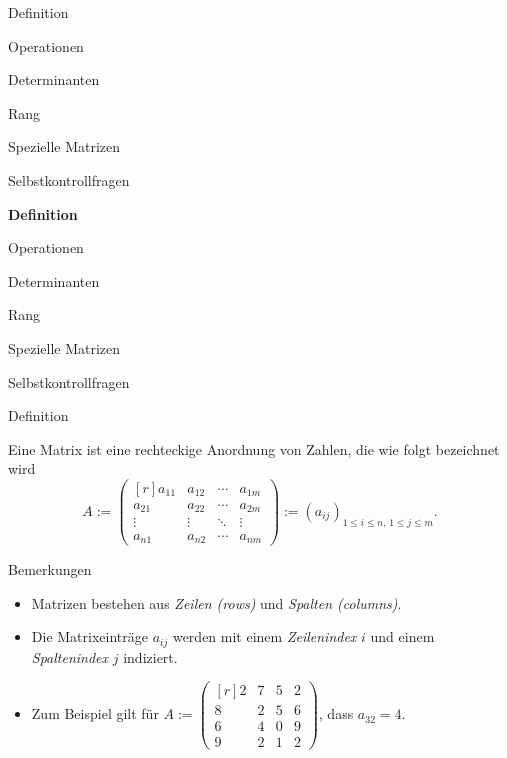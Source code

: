 \documentclass[
  8pt,
  ignorenonframetext,
]{beamer}
\begin{document}
\begin{frame}{}
\protect\hypertarget{section-2}{}
\large
{}
\vfill

Definition

Operationen

Determinanten

Rang

Spezielle Matrizen

Selbstkontrollfragen \vfill
\end{frame}

\begin{frame}{}
\protect\hypertarget{section-3}{}
\large
{}
\vfill

\textbf{Definition}

Operationen

Determinanten

Rang

Spezielle Matrizen

Selbstkontrollfragen \vfill
\end{frame}

\begin{frame}{Definition}
\protect\hypertarget{definition-1}{}
\small
\begin{definition}[Matrix]
Eine Matrix ist eine rechteckige Anordnung von Zahlen, die wie folgt bezeichnet
wird
\begin{equation}
A := \begin{pmatrix*}[r]
a_{11} & a_{12} & \cdots & a_{1m} \\
a_{21} & a_{22} & \cdots & a_{2m} \\
\vdots & \vdots & \ddots & \vdots \\
a_{n1} & a_{n2} & \cdots & a_{nm}
\end{pmatrix*}
:= {(a_{ij})}_{1\le i\le n,\, 1\le j\le m}.
\end{equation}
\end{definition}

\footnotesize

Bemerkungen

\begin{itemize}
\item
  Matrizen bestehen aus \emph{Zeilen (rows)} und \emph{Spalten
  (columns)}.
\item
  Die Matrixeinträge \(a_{ij}\) werden mit einem \emph{Zeilenindex}
  \(i\) und einem \emph{Spaltenindex} \(j\) indiziert. \vspace{2mm}
\item
  Zum Beispiel gilt für
  \(A:=\begin{pmatrix*}[r] 2 & 7 & 5 & 2 \\ 8 & 2 & 5 & 6 \\ 6 & 4 & 0 & 9 \\ 9 & 2 & 1 & 2 \end{pmatrix*}\),
  dass \(a_{32} = 4\).
\end{itemize}
\end{frame}
\end{document}
